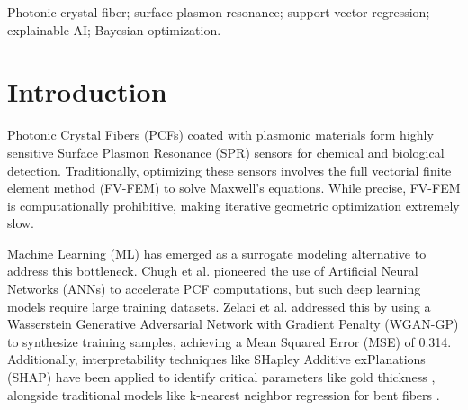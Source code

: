 \documentclass[conference]{IEEEtran}
\begin{document}
\begin{abstract}
The design of Photonic Crystal Fiber based Surface Plasmon Resonance sensors relies on computationally expensive simulations. While recent studies propose Generative Adversarial Networks (GAN) for data augmentation, we demonstrate an Augmentation Paradox where GAN generated samples introduce non physical noise that degrades rigorous kernel models. Instead, we propose a lightweight Bayesian optimized Support Vector Regression model. Achieving a Mean Squared Error of 0.121, our Support Vector Regression outperforms GAN augmented neural networks by over 60 percent without requiring synthetic data. Utilizing SHapley Additive exPlanations (SHAP) values, we identify the outer cladding geometry as the primary driver of confinement loss. Furthermore, Monte Carlo robustness analysis reveals the sensor pitch is most critical for spectral stability, causing a 1.23 nm resonance jitter at a 3 percent manufacturing tolerance. 
\end{abstract}

\begin{IEEEkeywords}
Photonic crystal fiber; surface plasmon resonance; support vector regression; explainable AI; Bayesian optimization.
\end{IEEEkeywords}

\IEEEpeerreviewmaketitle

\IEEEpubidadjcol

\section{Introduction}
Photonic Crystal Fibers (PCFs) coated with plasmonic materials form highly sensitive Surface Plasmon Resonance (SPR) sensors for chemical and biological detection. Traditionally, optimizing these sensors involves the full vectorial finite element method (FV-FEM) to solve Maxwell's equations. While precise, FV-FEM is computationally prohibitive, making iterative geometric optimization extremely slow.

Machine Learning (ML) has emerged as a surrogate modeling alternative to address this bottleneck. Chugh et al. \cite{b2} pioneered the use of Artificial Neural Networks (ANNs) to accelerate PCF computations, but such deep learning models require large training datasets. Zelaci et al. \cite{b1} addressed this by using a Wasserstein Generative Adversarial Network with Gradient Penalty (WGAN-GP) to synthesize training samples, achieving a Mean Squared Error (MSE) of 0.314. Additionally, interpretability techniques like SHapley Additive exPlanations (SHAP) have been applied to identify critical parameters like gold thickness \cite{b3}, alongside traditional models like k-nearest neighbor regression for bent fibers \cite{b4}.
\end{document}

